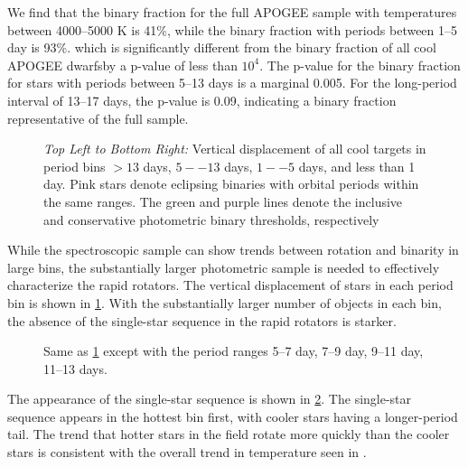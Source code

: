 \documentclass[manuscript]{aastex6}
\begin{document}
We find that the binary fraction for the full APOGEE sample with temperatures
between 4000--5000 K is 41\%,  while the binary fraction with periods 
between 1--5 day is 93\%. which
is significantly different from the binary fraction of all cool APOGEE dwarfsby a
p-value of less than \(10^4\). The p-value for the binary fraction for stars
with periods between 5--13 days is a marginal 0.005. For the long-period
interval of 13--17 days, the p-value is 0.09, indicating a binary fraction
representative of the full sample.

\begin{figure}[htb]
    \centering
    \caption{\emph{Top Left to Bottom Right:} Vertical displacement of all 
        cool \citet{McQuillan14} targets in period bins \(> 13\) days, 
        \(5--13\) days, \(1--5\) days, and less than 1 day. Pink stars denote 
        eclipsing binaries with orbital periods within the same ranges. The 
        green and purple lines denote the inclusive and conservative 
        photometric binary thresholds, 
    respectively}\label{fig:mcq_rapid_excess}
\end{figure}

While the spectroscopic sample can show trends between rotation and binarity in
large bins, the substantially larger photometric sample is needed to 
effectively characterize the rapid rotators. The vertical displacement of stars 
in each period bin is shown in \cref{fig:mcq_rapid_excess}. With the 
substantially larger number of objects in each bin, the absence of the
single-star sequence in the rapid rotators is starker.

\begin{figure}[htb]
    \centering
    \caption{Same as \cref{fig:mcq_rapid_excess} except with the period ranges
    5--7 day, 7--9 day, 9--11 day, 11--13 days.}
    \label{fig:mcquillan_transition}
\end{figure}

The appearance of the single-star sequence is shown in
\cref{fig:mcquillan_transition}. The single-star sequence appears in the
hottest bin first, with cooler stars having a longer-period tail. The trend
that hotter stars in the field rotate more quickly than the cooler stars 
is consistent with the overall trend in temperature seen in 
\citet{McQuillan14}.
\end{document}

